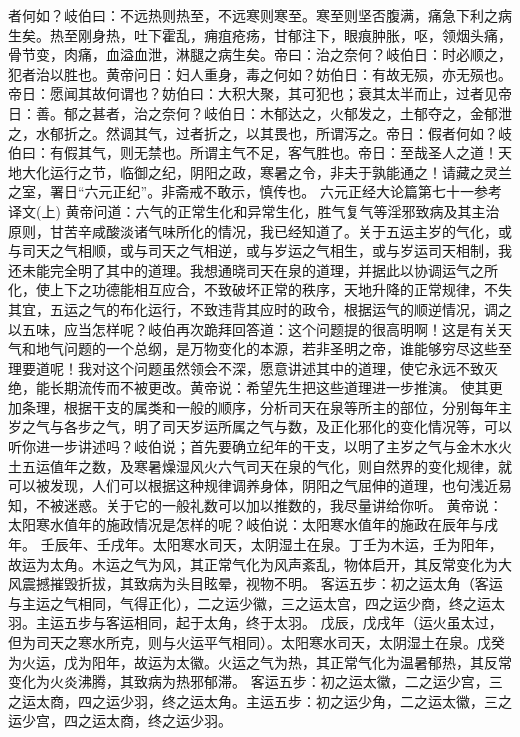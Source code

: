 \documentclass[a4paper,12pt,UTF8,twoside]{ctexbook}
\begin{document}
者何如？岐伯曰：不远热则热至，不远寒则寒至。寒至则坚否腹满，痛急下利之病生矣。热至刚身热，吐下霍乱，痈疽疮疡，甘郁注下，眼痕肿胀，呕，领烟头痛，骨节变，肉痛，血溢血泄，淋腿之病生矣。帝曰：治之奈何？岐伯日：时必顺之，犯者治以胜也。黄帝问日：妇人重身，毒之何如？妨伯日：有故无殒，亦无殒也。帝日：愿闻其故何谓也？妨伯曰：大积大聚，其可犯也；衰其太半而止，过者见帝日：善。郁之甚者，治之奈何？岐伯日：木郁达之，火郁发之，土郁夺之，金郁泄之，水郁折之。然调其气，过者折之，以其畏也，所谓泻之。帝日：假者何如？岐伯曰：有假其气，则无禁也。所谓主气不足，客气胜也。帝日：至哉圣人之道！天地大化运行之节，临御之纪，阴阳之政，寒暑之令，非夫于孰能通之！请藏之灵兰之室，署日“六元正纪”。非斋戒不敢示，慎传也。
六元正经大论篇第七十一参考译文(上)
黄帝问道：六气的正常生化和异常生化，胜气复气等淫邪致病及其主治原则，甘苦辛咸酸淡诸气味所化的情况，我已经知道了。关于五运主岁的气化，或与司天之气相顺，或与司天之气相逆，或与岁运之气相生，或与岁运司天相制，我还未能完全明了其中的道理。我想通晓司天在泉的道理，并据此以协调运气之所化，使上下之功德能相互应合，不致破坏正常的秩序，天地升降的正常规律，不失其宜，五运之气的布化运行，不致违背其应时的政令，根据运气的顺逆情况，调之以五味，应当怎样呢？岐伯再次跪拜回答道：这个问题提的很高明啊！这是有关天气和地气问题的一个总纲，是万物变化的本源，若非圣明之帝，谁能够穷尽这些至理要道呢！我对这个问题虽然领会不深，愿意讲述其中的道理，使它永远不致灭绝，能长期流传而不被更改。黄帝说：希望先生把这些道理进一步推演。
使其更加条理，根据干支的属类和一般的顺序，分析司天在泉等所主的部位，分别每年主岁之气与各步之气，明了司天岁运所属之气与数，及正化邪化的变化情况等，可以听你进一步讲述吗？岐伯说；首先要确立纪年的干支，以明了主岁之气与金木水火土五运值年之数，及寒暑燥湿风火六气司天在泉的气化，则自然界的变化规律，就可以被发现，人们可以根据这种规律调养身体，阴阳之气屈伸的道理，也句浅近易知，不被迷惑。关于它的一般礼数可以加以推数的，我尽量讲给你听。
黄帝说：太阳寒水值年的施政情况是怎样的呢？岐伯说：太阳寒水值年的施政在辰年与戌年。
壬辰年、壬戌年。太阳寒水司天，太阴湿土在泉。丁壬为木运，壬为阳年，故运为太角。木运之气为风，其正常气化为风声紊乱，物体启开，其反常变化为大风震撼摧毁折拔，其致病为头目眩晕，视物不明。
客运五步：初之运太角（客运与主运之气相同，气得正化），二之运少徽，三之运太宫，四之运少商，终之运太羽。主运五步与客运相同，起于太角，终于太羽。
戊辰，戊戌年（运火虽太过，但为司天之寒水所克，则与火运平气相同）。太阳寒水司天，太阴湿土在泉。戊癸为火运，戊为阳年，故运为太徽。火运之气为热，其正常气化为温暑郁热，其反常变化为火炎沸腾，其致病为热邪郁滞。
客运五步：初之运太徽，二之运少宫，三之运太商，四之运少羽，终之运太角。主运五步：初之运少角，二之运太徽，三之运少宫，四之运太商，终之运少羽。
\end{document}
